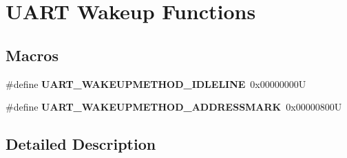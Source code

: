 \hypertarget{group___u_a_r_t___wake_up__functions}{}\section{U\+A\+RT Wakeup Functions}
\label{group___u_a_r_t___wake_up__functions}
\subsection*{Macros}
\begin{DoxyCompactItemize}
\item 
\mbox{\label{group___u_a_r_t___wake_up__functions_ga2411ed44c5d82db84c5819e1e2b5b8b3}} 
\#define {\bfseries U\+A\+R\+T\+\_\+\+W\+A\+K\+E\+U\+P\+M\+E\+T\+H\+O\+D\+\_\+\+I\+D\+L\+E\+L\+I\+NE}~0x00000000U
\item 
\mbox{\label{group___u_a_r_t___wake_up__functions_ga4c6935f26f8f2a9fe70fd6306a9882cb}} 
\#define {\bfseries U\+A\+R\+T\+\_\+\+W\+A\+K\+E\+U\+P\+M\+E\+T\+H\+O\+D\+\_\+\+A\+D\+D\+R\+E\+S\+S\+M\+A\+RK}~0x00000800U
\end{DoxyCompactItemize}


\subsection{Detailed Description}
